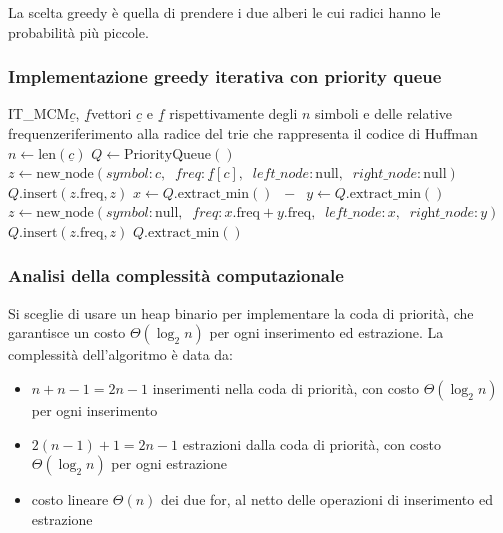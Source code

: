 La scelta greedy è quella di prendere i due alberi le cui radici hanno le probabilità più piccole.

\newpage

\subsubsection*{Implementazione greedy iterativa con priority queue}
\vspace{-7pt}
\begin{algo}{IT\_MCM}{$\underline{c}$, $\underline{f}$}{vettori $\underline{c}$ e $\underline{f}$ rispettivamente degli $n$ simboli e delle relative frequenze}{riferimento alla radice del trie che rappresenta il codice di Huffman}
	\State \(n \gets \text{len}(\underline{c})\)
	\State \(Q \gets \text{PriorityQueue}()\) 
	 
		\State \(z \gets \text{new\_node}(\textit{symbol}: c, \;\; \textit{freq}: \underline{f}[c], \;\; \textit{left\_node}: \text{null}, \;\; \textit{right\_node}: \text{null})\)
		\State \(Q.\text{insert}(z.\text{freq}, z)\)
	\EndFor
	 
		\State \(x \gets Q.\text{extract\_min}() \;\; - \;\; y \gets Q.\text{extract\_min}()\)
		\State \(z \gets \text{new\_node}(\textit{symbol}: \text{null}, \;\; \textit{freq}: x.\text{freq} + y.\text{freq}, \;\; \textit{left\_node}: x, \;\; \textit{right\_node}: y)\)
		\State \(Q.\text{insert}(z.\text{freq}, z)\)
	\EndFor
	\State \Return \(Q.\text{extract\_min}()\)
\end{algo}
\vspace{-18pt}

\subsubsection*{Analisi della complessità computazionale}
Si sceglie di usare un heap binario per implementare la coda di priorità, che garantisce un costo \(\Theta(\log_2 n)\) per ogni
inserimento ed estrazione. La complessità dell'algoritmo è data da:
\begin{itemize}
	\item \(n + n-1 = 2n-1\) inserimenti nella coda di priorità, con costo \(\Theta(\log_2 n)\) per ogni inserimento
	\item \(2(n-1) + 1 = 2n-1\) estrazioni dalla coda di priorità, con costo \(\Theta(\log_2 n)\) per ogni estrazione
	\item costo lineare \(\Theta(n)\) dei due for, al netto delle operazioni di inserimento ed estrazione
\end{itemize}
\vspace{-10pt}

